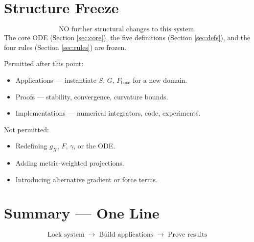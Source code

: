 \documentclass[11pt,oneside]{amsart}
\def\S{Section }%
\def\textbf#1{#1}%
\theoremstyle{plain}
\theoremstyle{definition}
\newcommand{\gX}{g_X}
\newcommand{\Fbase}{F_{\mathrm{base}}}
\begin{document}
\section{Structure Freeze}
\label{sec:frozen}

\begin{lockbox}
\[
\boxed{\text{NO further structural changes to this system.}}
\]
The core ODE (\S \ref{sec:core}), the five definitions (\S \ref{sec:defs}), and the
four rules (\S \ref{sec:rules}) are \textbf{frozen}.

\medskip
Permitted after this point:
\begin{itemize}[leftmargin=1.8em,nosep]
  \item \textbf{Applications} --- instantiate $S$, $G$, $\Fbase$ for a new domain.
  \item \textbf{Proofs} --- stability, convergence, curvature bounds.
  \item \textbf{Implementations} --- numerical integrators, code, experiments.
\end{itemize}

\medskip
Not permitted:
\begin{itemize}[leftmargin=1.8em,nosep]
  \item Redefining $\gX$, $F$, $\gamma$, or the ODE.
  \item Adding metric-weighted projections.
  \item Introducing alternative gradient or force terms.
\end{itemize}
\end{lockbox}

\section{Summary --- One Line}
\label{sec:oneline}

\begin{center}
\Large
\[
\boxed{
  \text{Lock system} \;\longrightarrow\; \text{Build applications}
  \;\longrightarrow\; \text{Prove results}
}
\]
\end{center}

\bigskip\bigskip

\appendix
\end{document}
